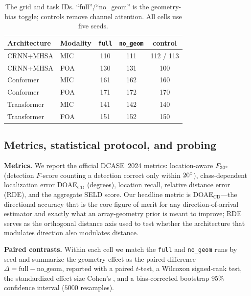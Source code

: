 \begin{table}[t]
\centering
\caption{The grid and task IDs. ``full''/``no\_geom'' is the geometry-bias
toggle; controls remove channel attention. All cells use five seeds.}
\label{tab:grid}
\begin{tabular}{llccc}
\toprule
Architecture & Modality & \texttt{full} & \texttt{no\_geom} & control \\
\midrule
CRNN+MHSA   & MIC & 110 & 111 & 112 / 113 \\
CRNN+MHSA   & FOA & 130 & 131 & 100 \\
Conformer   & MIC & 161 & 162 & 160 \\
Conformer   & FOA & 171 & 172 & 170 \\
Transformer & MIC & 141 & 142 & 140 \\
Transformer & FOA & 151 & 152 & 150 \\
\bottomrule
\end{tabular}
\end{table}

\subsection{Metrics, statistical protocol, and probing}
\label{sec:stats}
\textbf{Metrics.} We report the official DCASE~2024 metrics: location-aware
$F_{20^\circ}$ (detection $F$-score counting a detection correct only within
$20^\circ$), class-dependent localization error DOAE$_\mathrm{CD}$ (degrees),
location recall, relative distance error (RDE), and the aggregate SELD score. Our
headline metric is DOAE$_\mathrm{CD}$---the directional accuracy that is the core
figure of merit for any direction-of-arrival estimator and exactly what an
array-geometry prior is meant to improve; RDE serves as the orthogonal distance
axis used to test whether the architecture that modulates direction also
modulates distance.

\textbf{Paired contrasts.} Within each cell we match the \texttt{full} and
\texttt{no\_geom} runs by seed and summarize the geometry effect as the paired
difference $\Delta=\text{full}-\text{no\_geom}$, reported with a paired $t$-test,
a Wilcoxon signed-rank test, the standardized effect size Cohen's \dz, and a
bias-corrected bootstrap $95\%$ confidence interval ($5000$ resamples).

